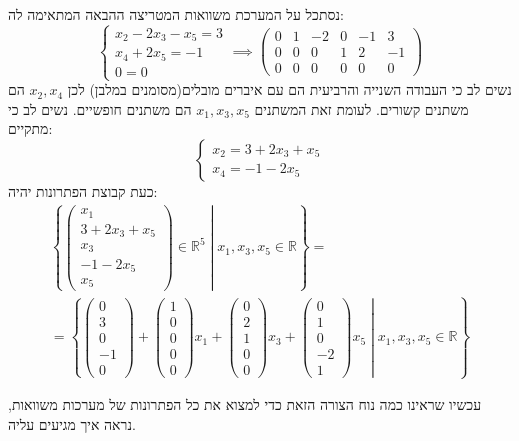 \documentclass{tstextbook}
\begin{document}
\begin{example}
נסתכל על המערכת משוואות המטריצה ההבאה המתאימה לה:
$$\begin{cases}x_{2}-2x_{3}-x_{5}=3 \\x_{4}+2x_{5}=-1 \\0=0\end{cases}\implies\left(\begin{array}{ccccc|c}0&\boxed{1}&-2&0&-1 &3\\0&0&0&\boxed{1}&2 &-1\\0&0&0&0&0&0
\end{array}\right)$$
נשים לב כי העבודה השנייה והרביעית הם עם איברים מובלים(מסומנים במלבן) לכן \(x_{2},x_{4}\) הם משתנים קשורים. לעומת זאת המשתנים \(x_{1},x_3,x_{5}\) הם משתנים חופשיים. נשים לב כי מתקיים:
$$\begin{cases}x_{2}=3+2x_{3}+x_{5} \\x_{4}=-1-2x_{5}
\end{cases}$$
כעת קבוצת הפתרונות יהיה:
\begin{gather*}\left.\left\{  \begin{pmatrix}x_{1} \\3+2x_{3}+x_{5} \\x_{3} \\-1-2x_{5} \\x_{5}\end{pmatrix} \in \mathbb{R}^{5} \;\right\rvert\;   x_{1},x_{3},x_{5} \in \mathbb{R}   \right\}= \\=\left.\left\{  \begin{pmatrix}0 \\3 \\0 \\-1 \\0\end{pmatrix} +\begin{pmatrix}1\\0\\0\\0\\0\end{pmatrix}x_{1}+\begin{pmatrix}0\\2\\1\\0\\0\end{pmatrix}x_{3}+\begin{pmatrix}0\\1\\0\\-2\\1 \end{pmatrix} x_{5}\;\right\rvert\;x_{1},x_{3},x_{5} \in \mathbb{R}\right\} 
\end{gather*}

\end{example}
עכשיו שראינו כמה נוח הצורה הזאת כדי למצוא את כל הפתרונות של מערכות משוואות, נראה איך מגיעים עליה.
\end{document}
